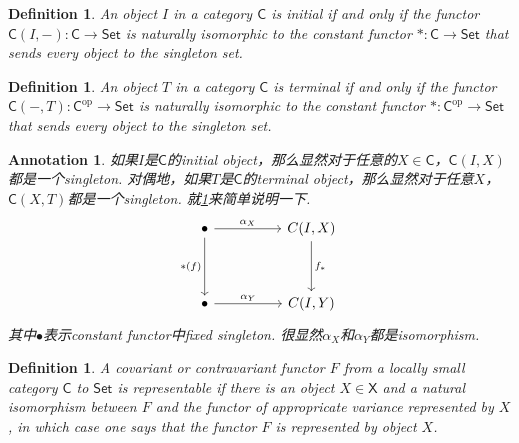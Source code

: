 \documentclass{article}
\newtheorem{definition}[theorem]{Definition}
\newtheorem{annotation}[theorem]{Annotation}
\newcommand*{\cat}[1]{\textsf{#1}\xspace}
\newcommand{\Set}{\textsf{Set}\xspace}
\newcommand{\op}{\textrm{op}}
\begin{document}
\begin{definition}\label{initial object characterized by representable functor}
\rm An object $I$ in a category $\cat{C}$ is initial if and only if the functor $\cat{C}(I,-):\cat{C}\to\Set$ is naturally isomorphic to the constant functor $*:\cat{C} \to \Set$ that sends every object to the singleton set. 
\end{definition}

\begin{definition}
\rm An object $T$ in a category $\cat{C}$ is terminal if and only if the functor $\cat{C}(-,T):\cat{C}^\op\to\Set$ is naturally isomorphic to the constant functor $*:\cat{C}^{\op} \to \Set$ that sends every object to the singleton set. 
\end{definition}

\begin{annotation}
\rm 如果$I$是$\cat{C}$的initial object，那么显然对于任意的$X \in \cat{C}$，$\cat{C}(I,X)$都是一个singleton. 对偶地，如果$T$是$\cat{C}$的terminal object，那么显然对于任意$X$，$\cat{C}(X,T)$都是一个singleton. 就\ref{initial object characterized by representable functor}来简单说明一下.
$$
\begin{tikzcd}
\bullet \arrow[rr, "\alpha_X"] \arrow[dd, "*(f)"'] &  & {C(I,X)} \arrow[dd, "f_*"] \\
                                                   &  &                            \\
\bullet \arrow[rr, "\alpha_Y"]                     &  & {C(I,Y)}                  
\end{tikzcd}
$$
其中$\bullet$表示constant functor中fixed singleton. 很显然$\alpha_X$和$\alpha_Y$都是isomorphism. 
\end{annotation}

\begin{definition}
\rm A covariant or contravariant functor $F$ from a locally small category $\cat{C}$ to $\Set$ is representable if there is an object $X \in \cat{X}$ and a natural isomorphism between $F$ and the functor of appropricate variance represented by $X$, in which case one says that the functor $F$ is represented by object $X$. 
\end{definition}
\end{document}
